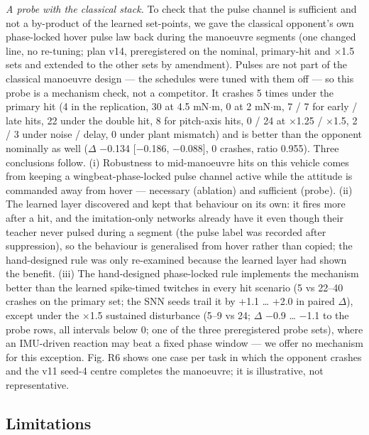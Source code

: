\documentclass[10pt,a4paper]{article}
\begin{document}
\emph{A probe with the classical stack.} To check that the pulse channel is sufficient and not a by-product of the learned set-points, we gave the classical opponent's own phase-locked hover pulse law back during the manoeuvre segments (one changed line, no re-tuning; plan v14, preregistered on the nominal, primary-hit and $\times$1.5 sets and extended to the other sets by amendment). Pulses are not part of the classical manoeuvre design --- the schedules were tuned with them off --- so this probe is a mechanism check, not a competitor. It crashes 5 times under the primary hit (4 in the replication, 30 at 4.5 mN$\cdot$m, 0 at 2 mN$\cdot$m, 7 / 7 for early / late hits, 22 under the double hit, 8 for pitch-axis hits, 0 / 24 at $\times$1.25 / $\times$1.5, 2 / 3 under noise / delay, 0 under plant mismatch) and is better than the opponent nominally as well ($\Delta$ $-$0.134 [$-$0.186, $-$0.088], 0 crashes, ratio 0.955). Three conclusions follow. (i) Robustness to mid-manoeuvre hits on this vehicle comes from keeping a wingbeat-phase-locked pulse channel active while the attitude is commanded away from hover --- necessary (ablation) and sufficient (probe). (ii) The learned layer discovered and kept that behaviour on its own: it fires more after a hit, and the imitation-only networks already have it even though their teacher never pulsed during a segment (the pulse label was recorded after suppression), so the behaviour is generalised from hover rather than copied; the hand-designed rule was only re-examined because the learned layer had shown the benefit. (iii) The hand-designed phase-locked rule implements the mechanism better than the learned spike-timed twitches in every hit scenario (5 vs 22--40 crashes on the primary set; the SNN seeds trail it by +1.1 \ldots{} +2.0 in paired $\Delta$), except under the $\times$1.5 sustained disturbance (5--9 vs 24; $\Delta$ $-$0.9 \ldots{} $-$1.1 to the probe rows, all intervals below 0; one of the three preregistered probe sets), where an IMU-driven reaction may beat a fixed phase window --- we offer no mechanism for this exception. Fig. R6 shows one case per task in which the opponent crashes and the v11 seed-4 centre completes the manoeuvre; it is illustrative, not representative.

\subsection{Limitations}
\end{document}
